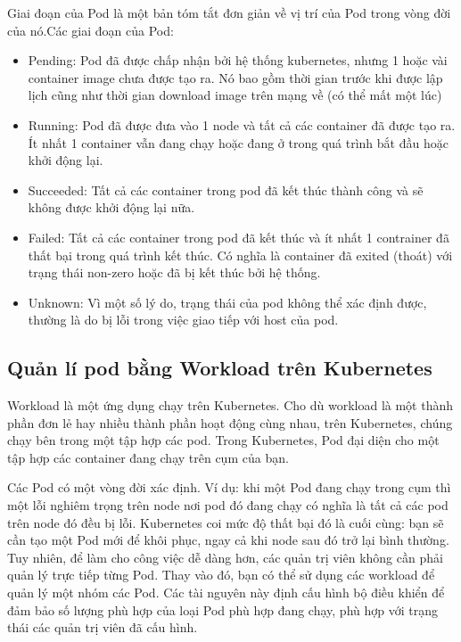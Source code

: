 \documentclass[12pt,a4paper]{report}
\begin{document}
				Giai đoạn của Pod là một bản tóm tắt đơn giản về vị trí của Pod trong vòng đời của nó.Các giai đoạn của Pod:
				\begin{itemize}				
					\item Pending: Pod đã được chấp nhận bởi hệ thống kubernetes, nhưng 1 hoặc vài container image chưa được tạo ra. Nó bao gồm thời gian trước khi được lập lịch cũng như thời gian download image trên mạng về (có thể mất một lúc)
					\item Running: Pod đã được đưa vào 1 node và tất cả các container đã được tạo ra. Ít nhất 1 container vẫn đang chạy hoặc đang ở trong quá trình bắt đầu hoặc khởi động lại.
					\item  Succeeded: Tất cả các container trong pod đã kết thúc thành công và sẽ không được khởi động lại nữa.
					\item  Failed: Tất cả các container trong pod đã kết thúc và ít nhất 1 contrainer đã thất bại trong quá trình kết thúc. Có nghĩa là container đã exited (thoát) với trạng thái non-zero hoặc đã bị kết thúc bởi hệ thống.
					\item  Unknown: Vì một số lý do, trạng thái của pod không thể xác định được, thường là do bị lỗi trong việc giao tiếp với host của pod.
				\end{itemize}
			\subsection{Quản lí pod bằng Workload trên Kubernetes}
				{\hspace{0.6cm}Workload là một ứng dụng chạy trên Kubernetes. Cho dù workload là một thành phần đơn lẻ hay nhiều thành phần hoạt động cùng nhau, trên Kubernetes, chúng chạy bên trong một tập hợp các pod. Trong Kubernetes, Pod đại diện cho một tập hợp các container đang chạy trên cụm của bạn.\\}
				
				Các Pod có một vòng đời xác định. Ví dụ: khi một Pod đang chạy trong cụm thì một lỗi nghiêm trọng trên node nơi pod đó đang chạy có nghĩa là tất cả các pod trên node đó đều bị lỗi. Kubernetes coi mức độ thất bại đó là cuối cùng: bạn sẽ cần tạo một Pod mới để khôi phục, ngay cả khi node sau đó trở lại bình thường.\\
				
				Tuy nhiên, để làm cho công việc dễ dàng hơn, các quản trị viên không cần phải quản lý trực tiếp từng Pod. Thay vào đó, bạn có thể sử dụng các workload để quản lý một nhóm các Pod. Các tài nguyên này định cấu hình bộ điều khiển để đảm bảo số lượng phù hợp của loại Pod phù hợp đang chạy, phù hợp với trạng thái các quản trị viên đã cấu hình.\\
				
\end{document}
